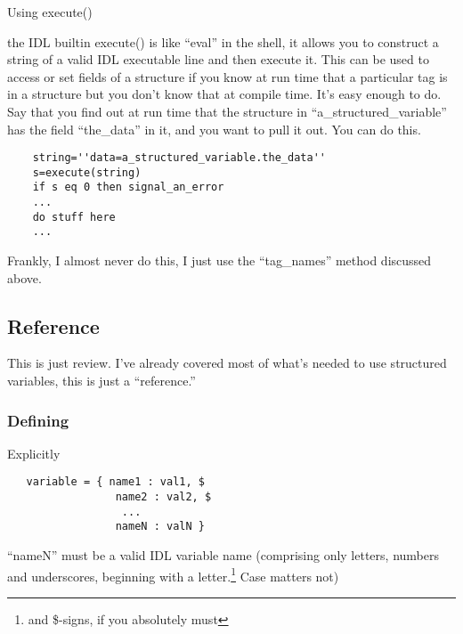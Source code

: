   \item Using execute() 
    
    the IDL builtin execute() is like ``eval'' in the shell, it allows
    you to construct a string of a valid IDL executable line and then
    execute it. This can be used to access or set fields of a
    structure if you know at run time that a particular tag is in a
    structure but you don't know that at compile time.  It's easy
    enough to do. Say that you find out at run time that the structure
    in ``a\_structured\_variable'' has the field ``the\_data'' in it,
    and you want to pull it out.  You can do this.

\begin{IDLExample}\begin{verbatim}
    string=''data=a_structured_variable.the_data''
    s=execute(string)
    if s eq 0 then signal_an_error
    ...
    do stuff here
    ...

\end{verbatim}\end{IDLExample}

Frankly, I almost never do this, I just use the ``tag\_names'' method
discussed above.


  \ee

\subsection{Reference}
This is just review. I've already covered most of what's needed to use
structured variables, this is just a ``reference.''

\subsubsection{Defining}

\bi
  \item Explicitly

\begin{IDLExample}\begin{verbatim}
   variable = { name1 : val1, $
                 name2 : val2, $
                  ... 
                 nameN : valN } 

\end{verbatim}\end{IDLExample}
    
    ``nameN'' must be a valid IDL variable name (comprising only
    letters, numbers and underscores, beginning with a
    letter.\footnote{and \$-signs, if you absolutely must} Case
    matters not)



